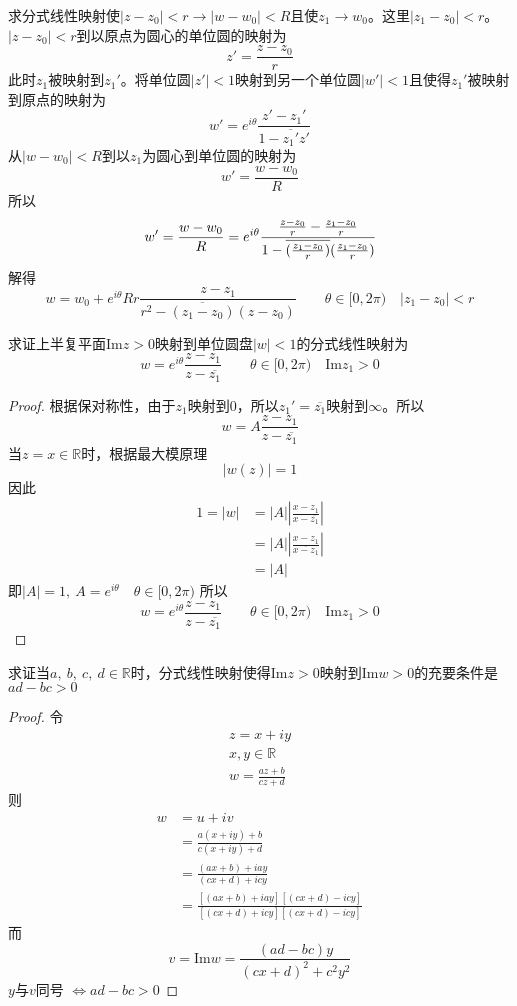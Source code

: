 \begin{homeworkProblem}
求分式线性映射使$|z-z_0|<r\longrightarrow|w-w_0|<R$且使$z_1\rightarrow w_0$。这里$|z_1-z_0|<r$。
\newline
\solution
$|z-z_0|<r$到以原点为圆心的单位圆的映射为
\[
z' = \frac{z-z_0}{r}
\]
此时$z_1$被映射到$z_1'$。将单位圆$|z'|<1$映射到另一个单位圆$|w'|<1$且使得$z_1'$被映射到原点的映射为
\[
w' = e^{i\theta}\frac{z'-z_1'}{1-\overline{z_1'}z'}
\]
从$|w-w_0|<R$到以$z_1$为圆心到单位圆的映射为
\[
w' = \frac{w-w_0}{R}
\]
所以
\[
w' = \frac{w-w_0}{R} = e^{i\theta}\cfrac{\frac{z-z_0}{r} - \frac{z_1-z_0}{r}}
{1 - \overline{(\frac{z_1-z_0}{r})}(\frac{z_1-z_0}{r})}
\]
解得
\[
w = w_0 + e^{i\theta}Rr\frac{z-z_1}{r^2-\overline{(z_1-z_0)}(z-z_0)} \qquad \theta\in[0,2\pi)\quad|z_1-z_0|<r
\]
\end{homeworkProblem}
\begin{homeworkProblem}
求证上半复平面$\mathrm{Im}z>0$映射到单位圆盘$|w|<1$的分式线性映射为
\[
w = e^{i\theta}\frac{z-z_1}{z-\overline{z_1}}\qquad\theta\in[0,2\pi)\quad\mathrm{Im}z_1>0
\]
\begin{proof}
根据保对称性，由于$z_1$映射到$0$，所以$z_1' = \overline{z_1}$映射到$\infty$。所以
\[w=A\frac{z-z_1}{z-\overline{z_1}}\]
当$z=x\in\mathbb{R}$时，根据最大模原理\[|w(z)| = 1\]
因此
\[
\begin{split}
1 = |w| &= |A|\left|\frac{x-z_1}{x-\overline{z_1}}\right| \\
&= |A|\left|\frac{x-z_1}{\overline{x-z_1}}\right| \\
&= |A|
\end{split}
\]
即$|A|=1,~A=e^{i\theta}\quad\theta\in[0,2\pi)$
所以
\[
w = e^{i\theta}\frac{z-z_1}{z-\overline{z_1}}\qquad\theta\in[0,2\pi)\quad\mathrm{Im}z_1>0
\]
\end{proof}
\end{homeworkProblem}

\begin{homeworkProblem}
    求证当$a,~b,~c,~d\in\mathbb{R}$时，分式线性映射使得$\mathrm{Im}z>0$映射到$\mathrm{Im}w>0$的充要条件是$ad-bc>0$
\begin{proof}
    令
\begin{gather*}
z = x+iy\\
x,y\in\mathbb{R}\\
w=\frac{az+b}{cz+d}
\end{gather*}
则
\[\begin{split}
w &= u+iv \\
&= \frac{a(x+iy)+b}{c(x+iy)+d}\\
&= \frac{(ax+b)+iay}{(cx+d)+icy}\\
&= \frac{[(ax+b)+iay][(cx+d)-icy]}{[(cx+d)+icy][(cx+d)-icy]}
\end{split}\]
而
\[
v = \mathrm{Im}w = \frac{(ad-bc)y}{(cx+d)^2+c^2y^2}
\]
$y$与$v$同号
$
\Leftrightarrow ad-bc>0
$
\end{proof}
\end{homeworkProblem}

